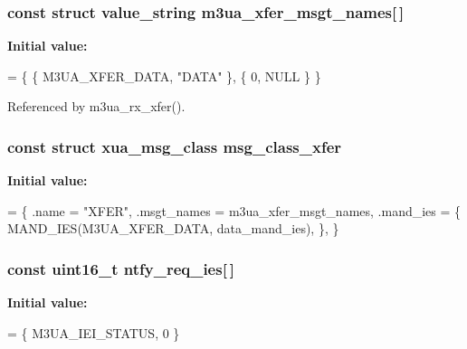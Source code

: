 \subsubsection[{m3ua\+\_\+xfer\+\_\+msgt\+\_\+names}]{\setlength{\rightskip}{0pt plus 5cm}const struct value\+\_\+string m3ua\+\_\+xfer\+\_\+msgt\+\_\+names[$\,$]\hspace{0.3cm}{\ttfamily [static]}}\label{m3ua_8c_ab7c93245b2f1ec5018cc58d59317bacf}
{\bfseries Initial value\+:}
\begin{DoxyCode}
= \{
        \{ M3UA_XFER_DATA,       \textcolor{stringliteral}{"DATA"} \},
        \{ 0, NULL \}
\}
\end{DoxyCode}


Referenced by m3ua\+\_\+rx\+\_\+xfer().

\subsubsection[{msg\+\_\+class\+\_\+xfer}]{\setlength{\rightskip}{0pt plus 5cm}const struct {\bf xua\+\_\+msg\+\_\+class} msg\+\_\+class\+\_\+xfer\hspace{0.3cm}{\ttfamily [static]}}\label{m3ua_8c_af0e6d3c9b9322f03fc705e1666be4ad9}
{\bfseries Initial value\+:}
\begin{DoxyCode}
= \{
        .name = \textcolor{stringliteral}{"XFER"},
        .msgt\_names = m3ua_xfer_msgt_names,
        .mand\_ies = \{
                MAND_IES(M3UA_XFER_DATA, data_mand_ies),
        \},
\}
\end{DoxyCode}
\subsubsection[{ntfy\+\_\+req\+\_\+ies}]{\setlength{\rightskip}{0pt plus 5cm}const uint16\+\_\+t ntfy\+\_\+req\+\_\+ies[$\,$]\hspace{0.3cm}{\ttfamily [static]}}\label{m3ua_8c_a7a4668e13461858e7ae5c96f946f032c}
{\bfseries Initial value\+:}
\begin{DoxyCode}
= \{
        M3UA_IEI_STATUS, 0
\}
\end{DoxyCode}
